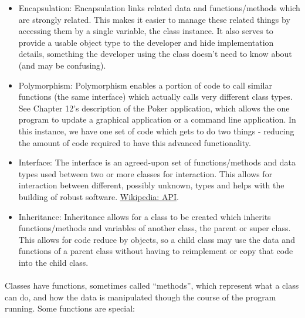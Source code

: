 \documentclass[letter,10pt]{article}
\begin{document}
\begin{itemize}
    \item Encapsulation: Encapsulation links related data and functions/methods which are strongly related. This makes it easier
to manage these related things by accessing them by a single variable, the class instance. It also serves to provide a usable object type to the developer and hide implementation details, something the developer using the class doesn't need to know about (and may be confusing).
    \item Polymorphism: Polymorphism enables a portion of code to call similar functions (the same interface) which actually
calls very different class types. See Chapter 12’s description of the Poker application, which allows
the one program to update a graphical application or a command line application. In this instance, we
have one set of code which gets to do two things - reducing the amount of code required to have this
advanced functionality.
    \item Interface: The interface is an agreed-upon set of functions/methods and data types used between two or more classes for interaction. This allows for interaction between different, possibly unknown, types and helps with the building of robust software. \href{https://en.wikipedia.org/wiki/API}{Wikipedia: API}.
    \item Inheritance: Inheritance allows for a class to be created which inherits functions/methods and variables of another
class, the parent or super class. This allows for code reduce by objects, so a child class may use the
data and functions of a parent class without having to reimplement or copy that code into the child
class.
\end{itemize}

\paragraph{}Classes have functions, sometimes called ``methods'', which represent what a class can do, and how the data is manipulated though the course of the program running. Some functions are special:
\end{document}
